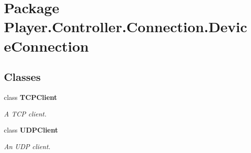 \section{Package Player.\-Controller.\-Connection.\-Device\-Connection}
\label{namespace_player_1_1_controller_1_1_connection_1_1_device_connection}
\subsection*{Classes}
\begin{DoxyCompactItemize}
\item 
class {\bf T\-C\-P\-Client}
\begin{DoxyCompactList}\small\item\em A T\-C\-P client. \end{DoxyCompactList}\item 
class {\bf U\-D\-P\-Client}
\begin{DoxyCompactList}\small\item\em An U\-D\-P client. \end{DoxyCompactList}\end{DoxyCompactItemize}
